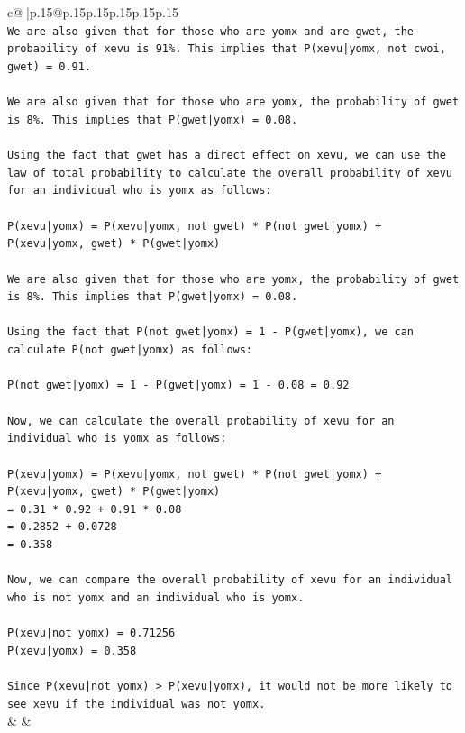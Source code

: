 \documentclass{article}
\begin{document}
{\begin{supertabular}{c@{$\;$}|p{.15\linewidth}@{}p{.15\linewidth}p{.15\linewidth}p{.15\linewidth}p{.15\linewidth}p{.15\linewidth}}
{{{\\ 
\texttt{We are also given that for those who are yomx and are gwet, the probability of xevu is 91\%. This implies that P(xevu|yomx, not cwoi, gwet) = 0.91.} \\
\\ 
\texttt{We are also given that for those who are yomx, the probability of gwet is 8\%. This implies that P(gwet|yomx) = 0.08.} \\
\\ 
\texttt{Using the fact that gwet has a direct effect on xevu, we can use the law of total probability to calculate the overall probability of xevu for an individual who is yomx as follows:} \\
\\ 
\texttt{P(xevu|yomx) = P(xevu|yomx, not gwet) * P(not gwet|yomx) + P(xevu|yomx, gwet) * P(gwet|yomx)} \\
\\ 
\texttt{We are also given that for those who are yomx, the probability of gwet is 8\%. This implies that P(gwet|yomx) = 0.08.} \\
\\ 
\texttt{Using the fact that P(not gwet|yomx) = 1 {-} P(gwet|yomx), we can calculate P(not gwet|yomx) as follows:} \\
\\ 
\texttt{P(not gwet|yomx) = 1 {-} P(gwet|yomx) = 1 {-} 0.08 = 0.92} \\
\\ 
\texttt{Now, we can calculate the overall probability of xevu for an individual who is yomx as follows:} \\
\\ 
\texttt{P(xevu|yomx) = P(xevu|yomx, not gwet) * P(not gwet|yomx) + P(xevu|yomx, gwet) * P(gwet|yomx)} \\
\texttt{= 0.31 * 0.92 + 0.91 * 0.08} \\
\texttt{= 0.2852 + 0.0728} \\
\texttt{= 0.358} \\
\\ 
\texttt{Now, we can compare the overall probability of xevu for an individual who is not yomx and an individual who is yomx. } \\
\\ 
\texttt{P(xevu|not yomx) = 0.71256} \\
\texttt{P(xevu|yomx) = 0.358} \\
\\ 
\texttt{Since P(xevu|not yomx) > P(xevu|yomx), it would not be more likely to see xevu if the individual was not yomx.} \\
            }
        }
    }
    & & \\ \\


\end{supertabular}}
\end{document}

